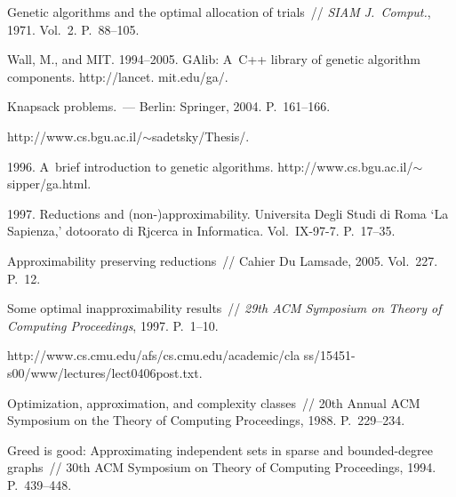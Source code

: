  \begin{multicols}{2}

\renewcommand{\bibname}{\protect\rmfamily Литература}

{\small\frenchspacing
{%
\begin{thebibliography}{99}

Genetic algorithms and the optimal allocation of
trials~// \textit{SIAM J.~Comput.}, 1971. Vol.~2. P.~88--105.

Wall, M., and MIT. 1994--2005.
GAlib: A~C++ library of genetic algorithm
components. {\sf
http://lancet. mit.edu/ga/}.


{Knapsack problems}.~---
Berlin: Springer, 2004. P.~161--166.

{\sf http://www.cs.bgu.ac.il/$\sim$sadetsky/Thesis/}.

  1996.
A~brief introduction to genetic algorithms.
{\sf http://www.cs.bgu.ac.il/$\sim$sipper/ga.html}.

\columnbreak

 1997.
Reductions and (non-)approximability. Universita
Degli Studi di Roma `La Sapienza,' dotoorato di Rjcerca in
Informatica. Vol.~IX-97-7. P.~17--35.

Approximability preserving
reductions~// {Cahier Du Lamsade}, 2005. Vol.~227. P.~12.

Some optimal inapproximability results~//
\textit{29th ACM Symposium on Theory of
Computing Proceedings}, 1997.  P.~1--10.

{\sf http://www.cs.cmu.edu/afs/cs.cmu.edu/academic/cla ss/15451-s00/www/lectures/lect0406post.txt}.


Optimization, approximation,
and complexity classes~// {20th Annual ACM Symposium on the
Theory of Computing Proceedings}, 1988. %
P.~229--234.

Greed is good: Approximating
independent sets in sparse and bounded-degree graphs~// {30th
ACM Symposium on Theory of Computing Proceedings},  1994.
P.~439--448.


\end{thebibliography}}}
\end{multicols}

